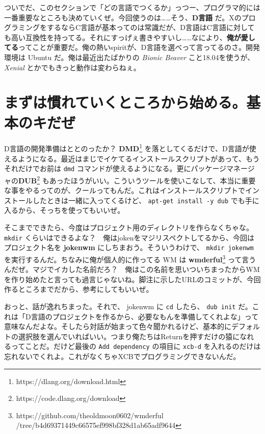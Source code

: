 \documentclass[12pt,a4paper]{jsarticle}
\begin{document}
ついでだ、このセクションで「どの言語でつくるか」っつー、プログラマ的には一番重要なところも決めていくぜ。今回使うのは……そう、\textbf{D言語} だ。XのプログラミングをするならC言語が基本ってのは常識だが、D言語はC言語に対しても高い互換性を持ってる。それにすっげぇ書きやすいし……なにより、\textbf{俺が愛してる}ってことが重要だ。俺の熱いspiritが、D言語を選べって言ってるのさ。開発環境は Ubuntu だ。俺は最近出たばかりの \textit{Bionic Beaver} こと18.04を使うが、\textit{Xenial} とかでもきっと動作は変わらねぇ。

\section{まずは慣れていくところから始める。基本のキだぜ}


D言語の開発準備はととのったか？ \textbf{DMD}\footnote{https://dlang.org/download.html} を落としてくるだけで、D言語が使えるようになる。最近はまじでイケてるインストールスクリプトがあって、もうそれだけでお前は \lstinline{dmd} コマンドが使えるようになる。更にパッケージマネージャの\textbf{DUB}\footnote{https://code.dlang.org/download} もあったほうがいい。こういうツールを使いこなして、本当に重要な事をやるってのが、クールってもんだ。これはインストールスクリプトでインストールしたときは一緒に入ってくるけど、 \lstinline{apt-get install -y dub} でも手に入るから、そっちを使ってもいいぜ。

そこまでできたら、今度はプロジェクト用のディレクトリを作らなくちゃな。 \lstinline{mkdir} くらいはできるよな？　俺はjokenをマジリスペクトしてるから、今回はプロジェクト名を \textbf{jokenwm} にしちまおう。そういうわけで、 \lstinline{mkdir jokenwm} を実行するんだ。ちなみに俺が個人的に作ってる WM は \textbf{wmderful}\footnote{https://github.com/theoldmoon0602/wmderful\\/tree/b4d69371449c66575ef998bf328d1ab65adf9644} って言うんだぜ。マジでイカした名前だろ？　俺はこの名前を思いついちまったからWMを作り始めたと言っても過言じゃないね。脚注に示したURLのコミットが、今回作るところまでだから、参考にしてもいいぜ。

おっと、話が逸れちまった。それで、 jokenwm に \lstinline{cd} したら、 \lstinline{dub init} だ。これは「D言語のプロジェクトを作るから、必要なもんを準備してくれよな」って意味なんだよな。そしたら対話が始まって色々聞かれるけど、基本的にデフォルトの選択肢を選んでいればいい。つまり俺たちはReturnを押すだけの猿になれるってことだ。だけど最後の \lstinline{Add dependency} の項目に \lstinline{xcb-d} を入れるのだけは忘れないでくれよ。これがなくちゃXCBでプログラミングできないんだ。
\end{document}
